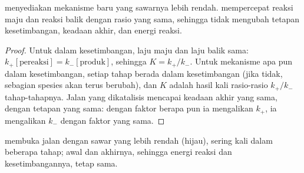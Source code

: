 \begin{proposition}\label{prop:b1:elementary-steps:catalysis}
 menyediakan mekanisme baru yang sawarnya lebih rendah. 
mempercepat reaksi maju dan reaksi balik dengan rasio yang sama, sehingga
tidak mengubah tetapan kesetimbangan, keadaan akhir, dan energi reaksi.
\end{proposition}

\begin{proof}
Untuk  dalam kesetimbangan, laju maju dan laju balik sama:
$k_+[\text{pereaksi}] = k_-[\text{produk}]$, sehingga $K = k_+/k_-$.
Untuk mekanisme apa pun dalam kesetimbangan, setiap tahap berada dalam
kesetimbangan (jika tidak, sebagian spesies akan terus berubah), dan $K$
adalah hasil kali rasio-rasio $k_+/k_-$ tahap-tahapnya. Jalan yang
dikatalisis mencapai keadaan akhir yang sama, dengan tetapan yang sama:
dengan faktor berapa pun ia mengalikan $k_+$, ia mengalikan $k_-$
dengan faktor yang sama.
\end{proof}

\begin{omfigure}

{\small {} membuka jalan dengan sawar yang lebih rendah (hijau),
sering kali dalam beberapa tahap; awal dan akhirnya, sehingga energi
reaksi dan kesetimbangannya, tetap sama.}
\end{omfigure}

